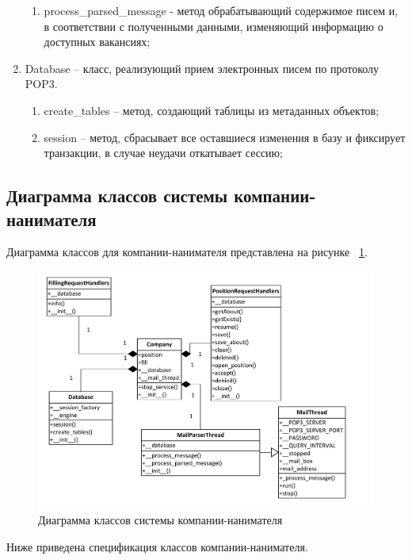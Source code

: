 \begin{enumerate}
\begin{enumerate}
	\item \underline{ }\underline{ }process_parsed_message - метод обрабатывающий содержимое писем и, в соответствии с полученными данными, изменяющий информацию о доступных вакансиях;
	\end{enumerate}
\item Database – класс, реализующий прием электронных писем по протоколу POP3.
	\begin{enumerate}
	\item create_tables – метод, создающий таблицы из метаданных объектов;
	\item session – метод, сбрасывает все оставшиеся изменения в базу и фиксирует транзакции, в случае неудачи откатывает сессию;
	\end{enumerate}	
\end{enumerate}

\subsection{Диаграмма классов системы компании-нанимателя}
Диаграмма классов для компании-нанимателя представлена на рисунке ~\ref{fig:Visio-cmp-uml}.

\begin{figure}[ht!]
\centering
 \includegraphics[width=\textwidth]{include/Visio-cmp-uml.pdf}
\caption{Диаграмма классов системы компании-нанимателя}
\label{fig:Visio-cmp-uml}
\end{figure}

Ниже приведена спецификация классов компании-нанимателя.

